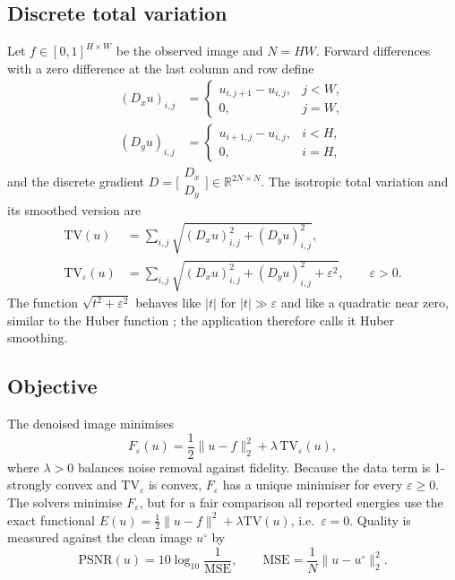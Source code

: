 \documentclass[conference,a4paper]{IEEEtran}
\newcommand{\R}{\mathbb{R}}
\newcommand{\norm}[1]{\lVert #1\rVert}
\newcommand{\TV}{\mathrm{TV}}
\begin{document}
\subsection{Discrete total variation}

Let $f\in[0,1]^{H\times W}$ be the observed image and $N=HW$. Forward differences with a zero difference at the last column and row define
\begin{align}
(D_xu)_{i,j}&=\begin{cases}u_{i,j+1}-u_{i,j}, & j<W,\\ 0, & j=W,\end{cases}\label{eq:dx}\\
(D_yu)_{i,j}&=\begin{cases}u_{i+1,j}-u_{i,j}, & i<H,\\ 0, & i=H,\end{cases}\label{eq:dy}
\end{align}
and the discrete gradient $D=\bigl[\begin{smallmatrix}D_x\\D_y\end{smallmatrix}\bigr]\in\R^{2N\times N}$. The isotropic total variation and its smoothed version are
\begin{align}
\TV(u)&=\sum_{i,j}\sqrt{(D_xu)_{i,j}^2+(D_yu)_{i,j}^2},\label{eq:tv}\\
\TV_\varepsilon(u)&=\sum_{i,j}\sqrt{(D_xu)_{i,j}^2+(D_yu)_{i,j}^2+\varepsilon^2},\qquad\varepsilon>0.\label{eq:tveps}
\end{align}
The function $\sqrt{t^2+\varepsilon^2}$ behaves like $|t|$ for $|t|\gg\varepsilon$ and like a quadratic near zero, similar to the Huber function \cite{huber1964}; the application therefore calls it Huber smoothing.

\subsection{Objective}

The denoised image minimises
\begin{equation}
F_\varepsilon(u)=\frac12\norm{u-f}_2^2+\lambda\,\TV_\varepsilon(u),
\label{eq:objective}
\end{equation}
where $\lambda>0$ balances noise removal against fidelity. Because the data term is 1-strongly convex and $\TV_\varepsilon$ is convex, $F_\varepsilon$ has a unique minimiser for every $\varepsilon\ge0$. The solvers minimise $F_\varepsilon$, but for a fair comparison all reported energies use the exact functional $E(u)=\frac12\norm{u-f}^2+\lambda\TV(u)$, i.e.\ $\varepsilon=0$. Quality is measured against the clean image $u^\circ$ by
\begin{equation}
\mathrm{PSNR}(u)=10\log_{10}\frac{1}{\mathrm{MSE}},\qquad \mathrm{MSE}=\frac1N\norm{u-u^\circ}_2^2.
\label{eq:psnr}
\end{equation}
\end{document}

